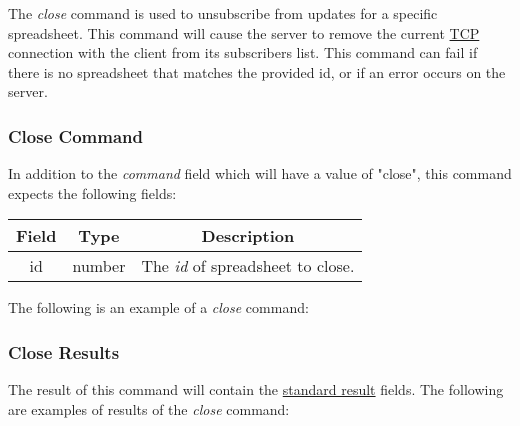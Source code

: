 The \emph{close} command is used to unsubscribe from updates for a specific 
spreadsheet. This command will cause the server to remove the current \href{https://en.wikipedia.org/wiki/Transmission_Control_Protocol}{TCP} 
connection with the client from its subscribers list. This command can fail 
if there is no spreadsheet that matches the provided id, or if an error 
occurs on the server.

\subsubsection{Close Command}
In addition to the \emph{command} field which will have a value of "close", this command expects the following fields:
\begin{table}[H]
    \begin{center}
        \begin{tabular}{|c|c|c|}\hline
            Field & Type & Description \\\hline
            id & number & The \emph{id} of spreadsheet to close. \\\hline
        \end{tabular}
    \end{center}
\end{table}

The following is an example of a \emph{close} command:


\subsubsection{Close Results}
The result of this command will contain the \hyperref[sec:message:result]{standard result} fields.
The following are examples of results of the \emph{close} command:



